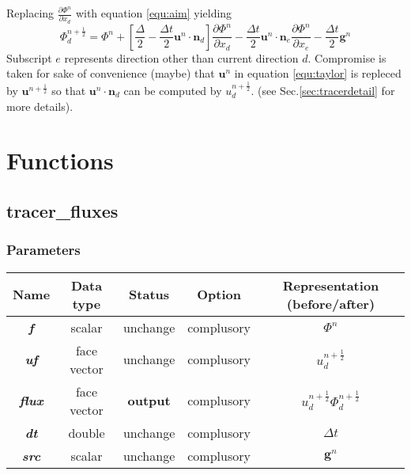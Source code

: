 \documentclass[a4paper]{article}
\newcommand{\func}[1]{\textbf{\textcolor{function}{#1}}}
\newcommand{\para}[1]{\textbf{\emph{\textcolor{para}{#1}}}}
\begin{document}
Replacing $ \frac{\partial \Phi^n}{\partial x_d}$ with equation \ref{equ:aim} yielding 
\begin{equation}
  \Phi^{n+ \frac{1}{2}}_d = \Phi^n + [\frac{\Delta}{2}- \frac{\Delta t}{2} \mathbf{u}^n \cdot \mathbf{n}_d] \frac{\partial \Phi^n}{\partial x_d} - \frac{\Delta t}{2} \mathbf{u}^n\cdot \mathbf{n}_e \frac{\partial \Phi^n}{\partial x_e} - \frac{\Delta t}{2} \mathbf{g}^n \label{equ:taylor}
\end{equation}
Subscript $e$ represents direction other than current direction $d$.
Compromise is taken for sake of convenience (maybe) that $ \mathbf{u}^n$ in equation \ref{equ:taylor} is repleced by $ \mathbf{u}^{n + \frac{1}{2}}$ so that $ \mathbf{u}^n\cdot \mathbf{n}_d$ can be computed by $u_d^{n + \frac{1}{2}}$. (see Sec.\ref{sec:tracerdetail} for more details).
\section{Functions}

\subsection{\func{tracer\_fluxes}}

\subsubsection{Parameters}
\begin{center}
  \begin{tabular}{|c|c|c|c|c|}
    \hline
    Name & Data type & Status & Option & Representation (before/after)\\[0.5ex]
    \hline\hline
    \para{f} & scalar & unchange & complusory & $\Phi^n$\\
    \hline
    \para{uf} & face vector & unchange & complusory & $u_d^{n+ \frac{1}{2}}$\\
    \hline
    \rowcolor{output} \para{flux} & face vector & \textbf{output} & complusory & $u_d^{n+ \frac{1}{2}}\Phi_d^{n+\frac{1}{2}}$\\
    \hline
    \para{dt} & double & unchange & complusory & $\Delta t$\\
    \hline
    \para{src} & scalar & unchange & complusory & $ \mathbf{g}^n$ \\
    \hline
  \end{tabular}
\end{center}
\end{document}
